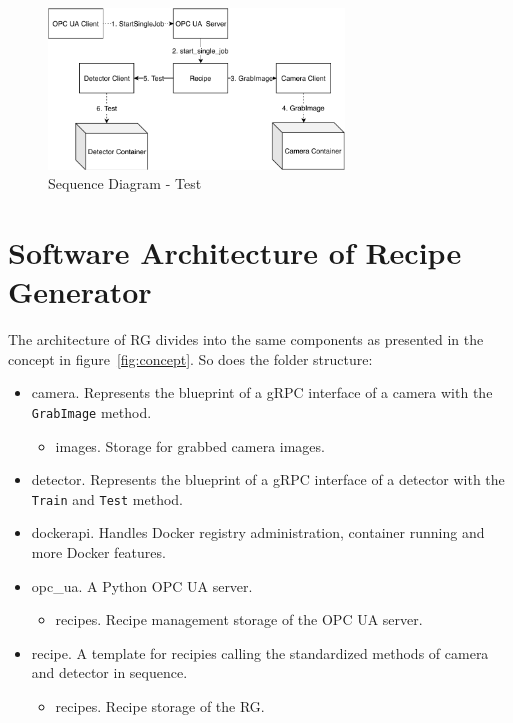 \begin{figure}[ht]
	\centering
  \includegraphics[width=0.7\textwidth]{img/SequenceDiagram-Test.pdf}
	\caption{Sequence Diagram - Test}
	\label{fig:SequenceDiagram-Test}
\end{figure}

\section{Software Architecture of Recipe Generator}
The architecture of RG divides into the same components as presented in the concept in figure~\ref{fig:concept}. So does the folder structure:
\begin{itemize}
    \item camera. Represents the blueprint of a gRPC interface of a camera with the \texttt{GrabImage} method.
    \begin{itemize}
        \item images. Storage for grabbed camera images.
    \end{itemize}
    \item detector. Represents the blueprint of a gRPC interface of a detector with the \texttt{Train} and \texttt{Test} method.
    \item dockerapi. Handles Docker registry administration, container running and more Docker features.
    \item opc\_ua. A Python OPC UA server.
    \begin{itemize}
        \item recipes. Recipe management storage of the OPC UA server.
    \end{itemize}
    \item recipe. A template for recipies calling the standardized methods of camera and detector in sequence.
    \begin{itemize}
        \item recipes. Recipe storage of the RG.
    \end{itemize}
\end{itemize}

